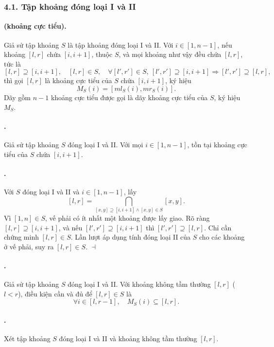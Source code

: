 \documentclass[11pt]{article}
\providecommand{\square}{\dashv}
\begin{document}
\subsubsection*{4.1. Tập khoảng đóng loại I và II}

\paragraph{ (khoảng cực tiểu).}
Giả sử tập khoảng $S$ là tập khoảng đóng loại I và II. Với
$i\in[1,n-1]$, nếu khoảng $[l,r]$ chứa $[i,i+1]$, thuộc $S$, và mọi khoảng như
vậy đều chứa $[l,r]$, tức là
\[
  [l,r]\supseteq[i,i+1],\quad [l,r]\in S,\quad
  \forall [l',r']\in S,\ [l',r']\supseteq[i,i+1]\Rightarrow [l',r']\supseteq[l,r],
\]
thì gọi $[l,r]$ là khoảng cực tiểu của $S$ chứa $[i,i+1]$, ký hiệu
\[
  M_S(i)=[ml_S(i),mr_S(i)].
\]
Dãy gồm $n-1$ khoảng cực tiểu được gọi là dãy khoảng cực tiểu của $S$, ký hiệu
$M_S$.

\paragraph{.}
Giả sử tập khoảng $S$ đóng loại I và II. Với mọi $i\in[1,n-1]$, tồn tại khoảng
cực tiểu của $S$ chứa $[i,i+1]$.

\paragraph{.}
Với $S$ đóng loại I và II và $i\in[1,n-1]$, lấy
\[
  [l,r]=\bigcap_{[x,y]\supseteq[i,i+1]\land [x,y]\in S}[x,y].
\]
Vì $[1,n]\in S$, vế phải có ít nhất một khoảng được lấy giao. Rõ ràng
$[l,r]\supseteq[i,i+1]$, và nếu $[l',r']\supseteq[i,i+1]$ thì
$[l',r']\supseteq[l,r]$. Chỉ cần chứng minh $[l,r]\in S$. Lần lượt áp dụng
tính đóng loại II của $S$ cho các khoảng ở vế phải, suy ra $[l,r]\in S$.
\hfill$\square$

\paragraph{.}
Giả sử tập khoảng $S$ đóng loại I và II. Với khoảng không tầm thường
$[l,r]$ ($l<r$), điều kiện cần và đủ để $[l,r]\in S$ là
\[
  \forall i\in[l,r-1],\quad M_S(i)\subseteq[l,r].
\]

\paragraph{.}
Xét tập khoảng $S$ đóng loại I và II và khoảng không tầm thường $[l,r]$.
\end{document}
